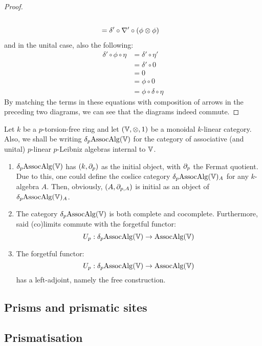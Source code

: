 \begin{proof}
$$\begin{aligned}
                                \\
                                & = \delta' \circ \nabla' \circ (\phi \tensor \phi)
                            \end{aligned}
                        $$
                    and in the unital case, also the following:
                        $$
                            \begin{aligned}
                                \delta' \circ \phi \circ \eta & = \delta' \circ \eta'
                                \\
                                & = \delta' \circ 0
                                \\
                                & = 0
                                \\
                                & = \phi \circ 0
                                \\
                                & = \phi \circ \delta \circ \eta
                            \end{aligned}
                        $$
                    By matching the terms in these equations with composition of arrows in the preceding two diagrams, we can see that the diagrams indeed commute.
                \end{proof}
        
            \begin{proposition}
                Let $k$ be a $p$-torsion-free ring and let $(\V, \tensor, 1)$ be a monoidal $k$-linear category. Also, we shall be writing $\delta_p\mathrm{Assoc}\mathrm{Alg}(\mathbb{V})$ for the category of associative (and unital) $p$-linear $p$-Leibniz algebras internal to $\mathbb{V}$. 
                    \begin{enumerate}
                        \item $\delta_p\mathrm{Assoc}\mathrm{Alg}(\mathbb{V})$ has $(k, \partial_p)$ as the initial object, with $\partial_p$ the Fermat quotient. Due to this, one could define the coslice category $\delta_p\mathrm{Assoc}\mathrm{Alg}(\mathbb{V})_A$ for any $k$-algebra $A$. Then, obviously, $(A, \partial_{p,A})$ is initial as an object of $\delta_p\mathrm{Assoc}\mathrm{Alg}(\mathbb{V})_A$.
                        \item The category $\delta_p\mathrm{Assoc}\mathrm{Alg}(\mathbb{V})$ is both complete and cocomplete. Furthermore, said (co)limits commute with the forgetful functor:
                            $$U_p: \delta_p\mathrm{Assoc}\mathrm{Alg}(\mathbb{V}) \to \mathrm{Assoc}\mathrm{Alg}(\mathbb{V})$$
                        \item The forgetful functor:
                            $$U_p: \delta_p\mathrm{Assoc}\mathrm{Alg}(\mathbb{V}) \to \mathrm{Assoc}\mathrm{Alg}(\mathbb{V})$$
                        has a left-adjoint, namely the free construction.
                    \end{enumerate}
            \end{proposition}
            
        \subsection{Prisms and prismatic sites}
            
        \subsection{Prismatisation}